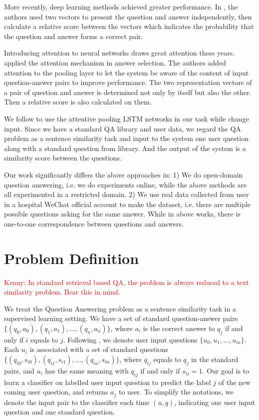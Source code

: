 \documentclass[a4paper,10pt]{article}
\newcommand{\KZ}[1]{\textcolor{red}{Kenny: #1}}
\begin{document}
More recently, deep learning methods achieved greater performance. In \cite{Yu2014,Feng2015,Severyn2015}, the authors used two vectors to present the question and answer independently, then calculate a relative score between the vectors which indicates the probability that the question and answer forms a correct pair.
\par Introducing attention to neural networks draws great attention these years. \cite{Cicero2016} applied the attention mechanism in answer selection. The authors added attention to the pooling layer to let the system be aware of the content of input question-answer pairs to improve performance. The two representation vectors of a pair of question and answer is determined not only by itself but also the other. Then a relative score is also calculated on them.
\par We follow \cite{Cicero2016} to use the attentive pooling LSTM networks in our task while change input. Since we have a standard QA library and user data, we regard the QA problem as a sentence similarity task and input to the system one user question along with a standard question from library. And the output of the system is a similarity score between the questions.
\par Our work significantly differs the above approaches in: 1) We do open-domain question answering, i.e. we do experiments online, while the above methods are all experimented in a restricted domain. 2) We use real data collected from user in a hospital WeChat official account to make the dataset, i.e. there are multiple possible questions asking for the same answer. While in above works, there is one-to-one correspondence between questions and answers.

\section{Problem Definition}
\KZ{In standard retrieval based QA, the problem is always reduced to a
text similarity problem. Bear this in mind.}
\par We treat the Question Answering problem as a sentence similarity task in a supervised learning setting. We have a set of standard question-answer pairs $\{(q_0,a_0),(q_1,a_1),...,(q_n,a_n)\}$, where $a_i$ is the correct answer to $q_j$ if and only if $i$ equals to $j$. Following \cite{Yih2013}, we denote user input questions $\{u_0,u_1,...,u_m\}$. Each $u_i$ is associated with a set of standard questions $\{(q_{i0},s_{i0}),(q_{i1},s_{i1}),...,(q_{in},s_{in})\}$, where $q_{ij}$ equals to $q_j$ in the standard pairs, and $u_i$ has the same meaning with $q_{ij}$ if and only if $s_{ij}=1$. Our goal is to learn a classifier on labelled user input question to predict the label $j$ of the new coming user question, and returns $a_j$ to user. To simplify the notations, we denote the input pair to the classifier each time $(u,q)$, indicating one user input question and one standard question.
\end{document}
